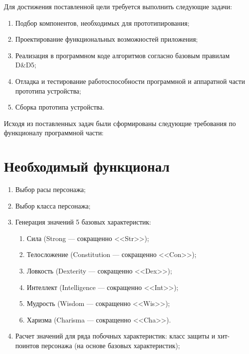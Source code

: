 \documentclass[12pt,a4paper]{article}
\begin{document}
Для достижения поставленной цели требуется выполнить следующие задачи:

\begin{enumerate}
    \item Подбор компонентов, необходимых для прототипирования;
    \item Проектирование функциональных возможностей приложения;
    \item Реализация в программном коде алгоритмов согласно базовым правилам D\&D5;
    \item Отладка и тестирование работоспособности программной и аппаратной части прототипа устройства;
    \item Сборка прототипа устройства.
\end{enumerate}

Исходя из поставленных задач были сформированы следующие требования по функционалу программной части:

\section{Необходимый функционал}

\begin{enumerate}
    \item Выбор расы персонажа;
    \item Выбор класса персонажа;
    \item Генерация значений 5 базовых характеристик:
    \begin{enumerate}
        \item Сила (Strong --- сокращенно <<Str>>);   
        \item Телосложение (Constitution --- сокращенно <<Con>>);
        \item Ловкость (Dexterity --- сокращенно <<Dex>>);
        \item Интеллект (Intelligence --- сокращенно <<Int>>);
        \item Мудрость (Wisdom --- сокращенно <<Wis>>);
        \item Харизма (Charisma --- сокращенно <<Cha>>).
    \end{enumerate}
    \item Расчет значений для ряда побочных характеристик: класс защиты и хит-поинтов персонажа (на основе базовых характеристик);
\end{enumerate}
\end{document}

